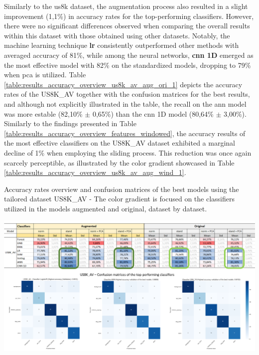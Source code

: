 Similarly to the \gls{us8k} dataset, the augmentation process also resulted in a slight improvement (1,1\%) in accuracy rates for the top-performing classifiers. However, there were no significant differences observed when comparing the overall results within this dataset with those obtained using other datasets. Notably, the machine learning technique \textbf{\gls{lr}} consistently outperformed other methods with averaged accuracy of 81\%, while among the neural networks, \textbf{\gls{cnn} 1D} emerged as the most effective model with 82\% on the standardized models, dropping to 79\% when \gls{pca} is utilized. Table \ref{table:results_accuracy_overview_us8k_av_aug_ori_1} depicts the accuracy rates of the US8K\_AV together with the confusion matrices for the best results, and although not explicitly illustrated in the table, the recall on the \gls{ann} model was more estable (82,10\% $\pm$ 0,65\%) than the \gls{cnn} 1D model (80,64\% $\pm$ 3,00\%).  Similarly to the findings presented in Table \ref{table:results_accuracy_overview_features_windowed}, the accuracy results of the most effective classifiers on the US8K\_AV dataset exhibited a marginal decline of 1\% when employing the sliding process. This reduction was once again scarcely perceptible, as illustrated by the color gradient showcased in Table \ref{table:results_accuracy_overview_us8k_av_aug_wind_1}.

\begin{table}[ht!]
    \caption[Accuracy rates overview and confusion matrices using the tailored dataset US8K\_AV - Models augmented x original (Focus on the classifiers dataset by dataset)]{Accuracy rates overview and confusion matrices of the best models using the tailored dataset US8K\_AV - The color gradient is focused on the classifiers utilized in the models augmented and original, dataset by dataset.}
    \label{table:results_accuracy_overview_us8k_av_aug_ori_1}
     \raggedright
    \includegraphics[width=1\textwidth]{resources/images/060-results/Results_classification_overview_us8k_av_aug_x_ori_1.png}
\end{table}

